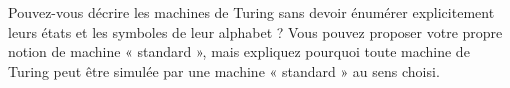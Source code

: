 \documentclass[../../../include/open-logic-section]{subfiles}
\begin{document}
\begin{prob}
  Pouvez-vous décrire les machines de Turing sans devoir
  énumérer explicitement leurs états et les symboles de leur
  alphabet ? Vous pouvez proposer votre propre notion de machine
  « standard », mais expliquez pourquoi toute machine de Turing
  peut être simulée par une machine « standard » au sens choisi.
\end{prob}
\end{document}
